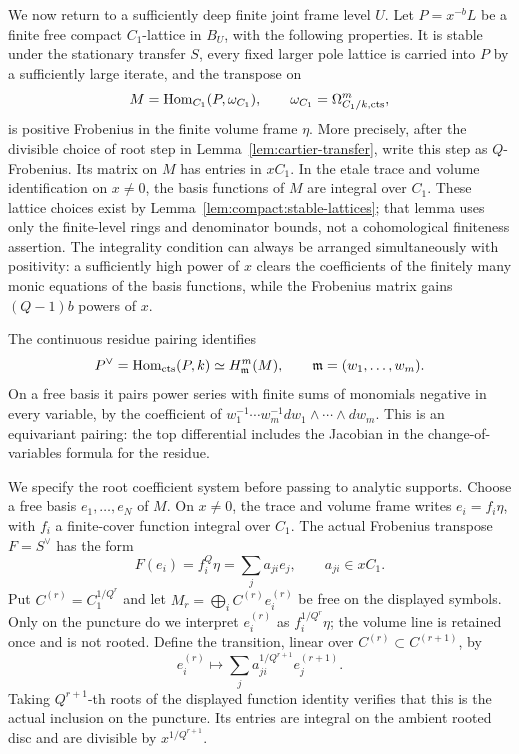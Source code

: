 We now return to a sufficiently deep finite joint frame level $U$.
Let $P=x^{-b}L$ be a finite free compact $C_1$-lattice in $B_U$,
with the following properties.  It is stable under the stationary
transfer $S$, every fixed larger pole lattice is carried into $P$
by a sufficiently large iterate, and the transpose on
\[
 M=\operatorname{Hom}_{C_1}(P,\omega_{C_1}),\qquad
 \omega_{C_1}=\Omega^m_{C_1/k,\mathrm{cts}},
\]
is positive Frobenius in the finite volume frame $\eta$.
More precisely, after the divisible choice of root step in
Lemma~\ref{lem:cartier-transfer}, write this step as $Q$-Frobenius.
Its matrix on $M$ has entries in $xC_1$.  In the etale trace and
volume identification on $x\ne0$, the basis functions of $M$
are integral over $C_1$.  These lattice choices exist by
Lemma~\ref{lem:compact:stable-lattices}; that lemma uses only the
finite-level rings and denominator bounds, not a cohomological
finiteness assertion.  The integrality condition can always be
arranged simultaneously with positivity: a sufficiently high
power of $x$ clears the coefficients of the finitely many monic
equations of the basis functions, while the Frobenius matrix gains
$(Q-1)b$ powers of $x$.

The continuous residue pairing identifies
\begin{equation}\label{support:residue-dual}
 P^\vee=\operatorname{Hom}_{\mathrm{cts}}(P,k)
 \simeq H^m_{\mathfrak m}(M),
 \qquad \mathfrak m=(w_1,\ldots,w_m).
\end{equation}
On a free basis it pairs power series with finite sums of monomials
negative in every variable, by the coefficient of
$w_1^{-1}\cdots w_m^{-1}dw_1\wedge\cdots\wedge dw_m$.
This is an equivariant pairing: the top differential includes the
Jacobian in the change-of-variables formula for the residue.

We specify the root coefficient system before passing to analytic
supports.  Choose a free basis $e_1,\ldots,e_N$ of $M$.  On $x\ne0$,
the trace and volume frame writes $e_i=f_i\eta$, with $f_i$ a
finite-cover function integral over $C_1$.  The actual Frobenius
transpose $F=S^\vee$ has the form
\[
 F(e_i)=f_i^Q\eta=\sum_j a_{ji}e_j,
 \qquad a_{ji}\in xC_1.
\]
Put $C^{(r)}=C_1^{1/Q^r}$ and let
$M_r=\bigoplus_i C^{(r)} e_i^{(r)}$ be free on the displayed symbols.
Only on the puncture do we interpret $e_i^{(r)}$ as
$f_i^{1/Q^r}\eta$; the volume line is retained once and is not rooted.
Define the transition, linear over $C^{(r)}\subset C^{(r+1)}$, by
\begin{equation}\label{support:root-coefficient-transition}
 e_i^{(r)}\longmapsto
       \sum_j a_{ji}^{1/Q^{r+1}}e_j^{(r+1)}.
\end{equation}
Taking $Q^{r+1}$-th roots of the displayed function identity verifies
that this is the actual inclusion on the puncture.  Its entries are
integral on the ambient rooted disc and are divisible by
$x^{1/Q^{r+1}}$.

